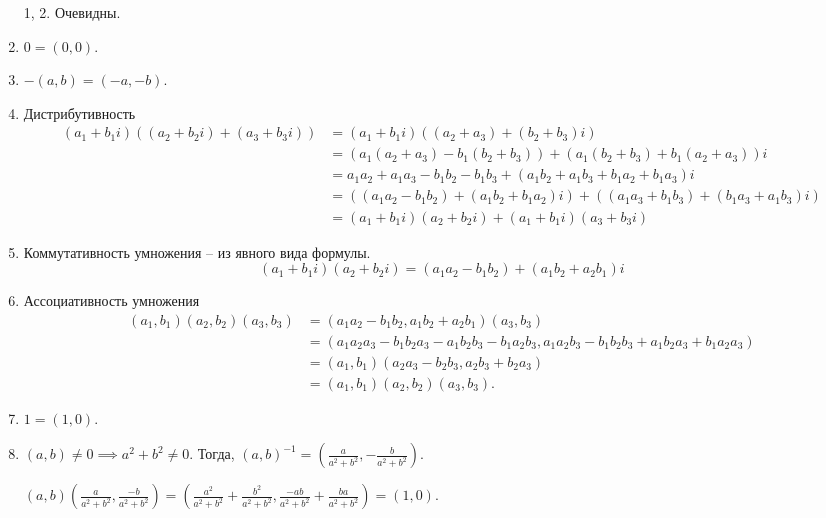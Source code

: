 \begin{enumerate}
\item[1, 2.] Очевидны.
\setcounter{enumi}{2}
\item $0 = (0, 0)$.
\item $-(a, b) = (-a, -b)$.
\item Дистрибутивность
    \begin{align*}
        (a_1 + b_1 i) ((a_2 + b_2 i) + (a_3 + b_3 i))
        &= (a_1 + b_1 i) ((a_2 + a_3) + (b_2 + b_3) i) \\
        &= (a_1 (a_2 + a_3) - b_1 (b_2 + b_3)) + (a_1 (b_2 + b_3) + b_1 (a_2 + a_3)) i \\
        &= a_1 a_2 + a_1 a_3 - b_1 b_2 - b_1 b_3 + (a_1 b_2 + a_1 b_3 + b_1 a_2 + b_1 a_3) i \\
        &= ((a_1 a_2 - b_1 b_2) + (a_1 b_2 + b_1 a_2)i) + ((a_1 a_3 + b_1 b_3) + (b_1 a_3 + a_1 b_3) i) \\
        &= (a_1 + b_1 i)(a_2 + b_2 i) + (a_1 + b_1 i)(a_3 + b_3 i)
    \end{align*}
\item Коммутативность умножения -- из явного вида формулы.
    \begin{equation*}
        (a_1 + b_1 i) (a_2 + b_2 i) = (a_1 a_2 - b_1 b_2) + (a_1 b_2 + a_2 b_1) i
    \end{equation*}

\item Ассоциативность умножения
    \begin{align*}
        (a_1, b_1)(a_2, b_2)(a_3, b_3)
        &= (a_1 a_2 - b_1 b_2, a_1 b_2 + a_2 b_1) (a_3, b_3) \\
        &= (a_1 a_2 a_3 - b_1 b_2 a_3 - a_1 b_2 b_3 - b_1 a_2 b_3, a_1 a_2 b_3 - b_1 b_2 b_3 + a_1 b_2 a_3 + b_1 a_2 a_3) \\
        &= (a_1, b_1)(a_2 a_3 - b_2 b_3, a_2 b_3 + b_2 a_3) \\
        &= (a_1, b_1)(a_2, b_2)(a_3, b_3)
    .\end{align*}

\item $1 = (1, 0)$.

\item $(a, b) \neq 0 \implies a^2 + b^2 \neq 0$. Тогда, $(a, b)^{-1} = \left(\frac{a}{a^2 + b^2}, -\frac{b}{a^2 + b^2}\right)$.

    $(a, b) \left(\frac{a}{a^2 + b^2}, \frac{-b}{a^2 + b^2}\right) = \left(\frac{a^2}{a^2 + b^2} + \frac{b^2}{a^2 + b^2}, \frac{-ab}{a^2 + b^2} + \frac{ba}{a^2 + b^2}\right) = (1, 0)$.
\end{enumerate}

